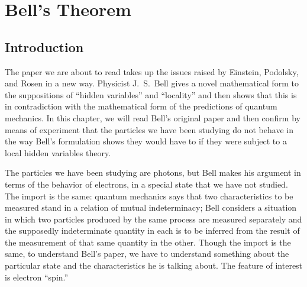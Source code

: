 \chapter{Bell's Theorem}



\renewcommand{\theequation}{\arabic{equation}}

\section*{Introduction}

The paper we are about to read takes up the issues raised by Einstein, Podolsky, and Rosen in a new way. Physicist J.~S.\ Bell gives a novel mathematical form to the suppositions of ``hidden variables'' and ``locality'' and then shows that this is in contradiction with the mathematical form of the predictions of quantum mechanics. In this chapter, we will read Bell’s original paper and then confirm by means of experiment that the particles we have been studying do not behave in the way Bell's formulation shows they would have to if they were subject to a local hidden variables theory.

The particles we have been studying are photons, but Bell makes his argument in terms of the behavior of electrons, in a special state that we have not studied. The import is the same: quantum mechanics says that two characteristics to be measured stand in a relation of mutual indeterminacy; Bell considers a situation in which two particles produced by the same process are measured separately and the supposedly indeterminate quantity in each is to be inferred from the result of the measurement of that same quantity in the other. Though the import is the same, to understand Bell’s paper, we have to understand something about the particular state and the characteristics he is talking about. The feature of interest is electron ``spin.''

